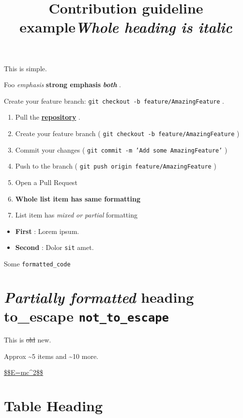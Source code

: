 \documentclass[11pt,a4paper]{article}
\title{Contribution guideline example}
\begin{document}
\maketitle

This is simple.

Foo \textit{emphasis} \textbf{strong emphasis} \textit{\textbf{both}} .

Create your feature branch: \texttt{git checkout -b feature/AmazingFeature} .

\begin{enumerate}
\item Pull the \href{https://github.com/docling-project/docling}{\textbf{repository}} .
\item Create your feature branch ( \texttt{git checkout -b feature/AmazingFeature} )
\item Commit your changes ( \texttt{git commit -m 'Add some AmazingFeature'} )
\item Push to the branch ( \texttt{git push origin feature/AmazingFeature} )
\item Open a Pull Request
\item \textbf{Whole list item has same formatting}
\item List item has \textit{mixed or partial} formatting
\end{enumerate}

\title{\textit{Whole heading is italic}}

\begin{itemize}
\item \textbf{First} : Lorem ipsum.
\item \textbf{Second} : Dolor \texttt{sit} amet.
\end{itemize}

Some \texttt{formatted_code}

\section{\textit{Partially formatted} heading to\_escape \texttt{not_to_escape}}

This is \sout{old} new.

Approx \textasciitilde{}5 items and \textasciitilde{}10 more.

\href{https://en.wikipedia.org/wiki/Albert\_Einstein}{\$\$E=mc\textasciicircum{}2\$\$}

\section{Table Heading}
\end{document}

